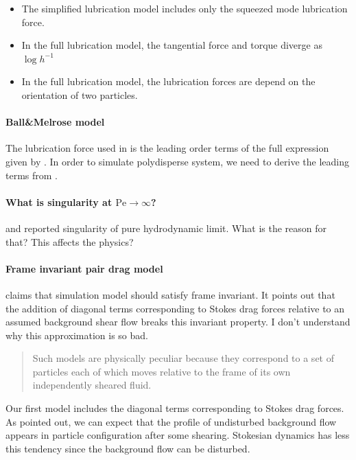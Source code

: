 \documentclass[12pt]{article}
\begin{document}
\begin{itemize}
  \item The simplified lubrication model
  includes only the squeezed mode lubrication force.
  \item 
  In the full lubrication model,
  the tangential force and torque
  diverge as $\log h^{-1}$
  \item 
  In the full lubrication model,
  the lubrication forces are depend on
  the orientation of two particles.
  \end{itemize}


\paragraph{Ball\&Melrose model}

The lubrication force used in \cite{Ball_1997}
is the leading order terms of 
the full expression given by \citet{Jeffrey_1992}.
%
In order to simulate  polydisperse system,
we need to derive 
the leading terms from \citet{Jeffrey_1992}.


\paragraph{What is singularity at $\mathrm{Pe}\to \infty$?}

\citet{Ball_1995}
and \citet{Melrose_1995}
reported singularity of pure hydrodynamic limit.
%
What is the reason for that?
%
This affects the physics?
%

\paragraph{Frame invariant pair drag model }

\citet{Ball_1997} claims that 
simulation model should satisfy frame invariant.
%
It points out that
the addition of diagonal terms corresponding to
Stokes drag forces
relative to an assumed background shear flow
breaks this invariant property.
%
I don't understand why this approximation is so bad.
%
\begin{quote}
Such models are physically peculiar
because they correspond to a set of particles
each of which moves relative to the frame
of its own independently sheared fluid. 
\end{quote}


Our first model includes the diagonal terms corresponding to
Stokes drag forces.
%
As \citet{Ball_1997} pointed out,
we can expect that 
the profile of undisturbed background flow appears
in particle configuration after some shearing.
%
Stokesian dynamics has less this tendency
since the background flow can be disturbed.
\end{document}
